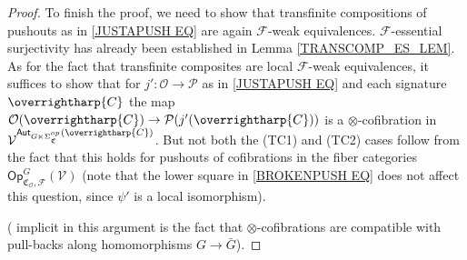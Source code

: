 \documentclass[a4paper,10pt
,draft
]{article}%
\numberwithin{equation}{section}
\numberwithin{figure}{section}
\newtheorem{lemma}[equation]{Lemma}%
\theoremstyle{definition} %
\newcommand{\vect}[1]{\text{\overrightharp{\ensuremath{#1}}}}
\newcommand{\Op}{\mathsf{Op}}%
\DeclareMathOperator{\Aut}{Aut}%
\newcommand{\F}{\ensuremath{\mathcal F}}
\newcommand{\V}{\ensuremath{\mathcal V}}
\renewcommand{\O}{\ensuremath{\mathcal O}}
\renewcommand{\P}{\ensuremath{\mathcal P}}
\newcommand{\1}{\ensuremath{\mathbbm 1}}%
\newcommand{\SC}{\Sigma_{\mathfrak C}}
\begin{document}
\begin{proof}
To finish the proof, we need to show that transfinite compositions of pushouts as in \eqref{JUSTAPUSH EQ}
are again $\F$-weak equivalences.
$\F$-essential surjectivity has already been established in Lemma \ref{TRANSCOMP_ES_LEM}.
As for the fact that transfinite composites are local $\F$-weak equivalences,
it suffices to show that for $j':\O \to \P$ as in \eqref{JUSTAPUSH EQ} and each signature $\vect{C}$
the map $\O(\vect{C}) \to \P(j'(\vect{C}))$ is a {\color{blue} $\otimes$-cofibration} in $\V^{\mathsf{Aut}_{G\ltimes \Sigma_{\mathfrak{C}}^{op}}(\vect{C})}$.
But not both the (TC1) and (TC2) cases follow from the fact that this holds for pushouts of cofibrations in the fiber categories 
$\mathsf{Op}^{G}_{\mathfrak C_{\O},\F}(\V)$
(note that the lower square in \eqref{BROKENPUSH EQ}
does not affect this question, since $\psi'$ is a local isomorphism).

(\color{blue} implicit in this argument is the fact that $\otimes$-cofibrations are compatible with pull-backs along homomorphisms 
$G \to \bar{G}$).
\end{proof}




\end{document}
